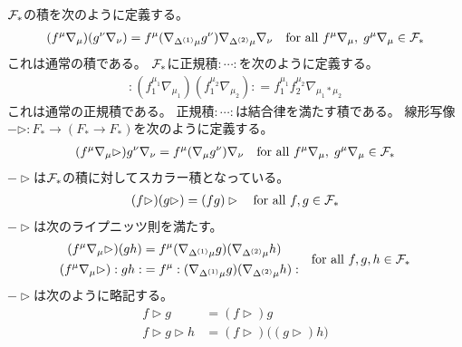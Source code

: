 	${\mathcal{F}}_*$の積を次のように定義する。
	\begin{equation*}\begin{split} %
		(f^\mu\nabla_\mu)(g^\nu\nabla_\nu) 
		= f^\mu(\nabla_{\Delta^{(1)}\mu}g^\nu)\nabla_{\Delta^{(2)}\mu}\nabla_\nu
		\quad\text{for all }f^\mu\nabla_\mu,\;g^\mu\nabla_\mu\in\mycal{F}_*
	\end{split}\end{equation*} %
	これは通常の積である。
	${\mathcal{F}}_*$に正規積$:\cdots:$を次のように定義する。
	\begin{equation*}\begin{split} %
		:(f_1^{\mu_1}\nabla_{\mu_1})(f_1^{\mu_2}\nabla_{\mu_2}): 
		= f_1^{\mu_1}f_2^{\mu_2}\nabla_{\mu_1*\mu_2}
	\end{split}\end{equation*} %
	これは通常の正規積である。
	正規積$:\cdots:$は結合律を満たす積である。
	線形写像$-\rhd:F_*\to (F_*\to F_*)$を次のように定義する。
	\begin{equation*}\begin{split} %
		(f^\mu\nabla_\mu\rhd)g^\nu\nabla_\nu 
		= f^\mu(\nabla_\mu g^\nu)\nabla_\nu
		\quad\text{for all }f^\mu\nabla_\mu,\;g^\mu\nabla_\mu\in\mycal{F}_*
	\end{split}\end{equation*} %
	$-\rhd$は${\mathcal{F}}_*$の積に対してスカラー積となっている。
	\begin{equation*}\begin{split} %
		(f\rhd)(g\rhd) = (fg)\rhd \quad\text{for all }f,g\in\mycal{F}_*
	\end{split}\end{equation*} %
	$-\rhd$は次のライプニッツ則を満たす。
	\begin{equation*}\begin{split} %
		(f^\mu\nabla_\mu\rhd)(gh) 
		&= f^\mu(\nabla_{\Delta^{(1)}\mu}g)(\nabla_{\Delta^{(2)}\mu}h) \\
		(f^\mu\nabla_\mu\rhd):gh:
		&= f^\mu:(\nabla_{\Delta^{(1)}\mu}g)(\nabla_{\Delta^{(2)}\mu}h):
	\end{split}
	\quad\text{for all }f,g,h\in\mycal{F}_*
	\end{equation*} %
	$-\rhd$は次のように略記する。
	\begin{equation*}\begin{split} %
		f\rhd g &= (f\rhd) g \\
		f\rhd g\rhd h &= (f\rhd)\bigl((g\rhd)h\bigr) \\
	\end{split}\end{equation*} %

